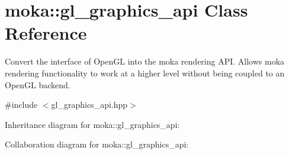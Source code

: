 \hypertarget{classmoka_1_1gl__graphics__api}{}\section{moka\+::gl\+\_\+graphics\+\_\+api Class Reference}
\label{classmoka_1_1gl__graphics__api}


Convert the interface of Open\+GL into the moka rendering A\+PI. Allows moka rendering functionality to work at a higher level without being coupled to an Open\+GL backend.  




{\ttfamily \#include $<$gl\+\_\+graphics\+\_\+api.\+hpp$>$}



Inheritance diagram for moka\+::gl\+\_\+graphics\+\_\+api\+:


Collaboration diagram for moka\+::gl\+\_\+graphics\+\_\+api\+:
